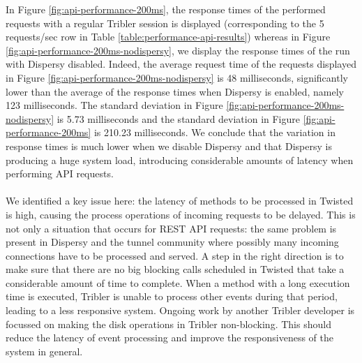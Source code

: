 In Figure \ref{fig:api-performance-200ms}, the response times of the performed requests with a regular Tribler session is displayed (corresponding to the 5 requests/sec row in Table \ref{table:performance-api-results}) whereas in Figure \ref{fig:api-performance-200ms-nodispersy}, we display the response times of the run with Dispersy disabled. Indeed, the average request time of the requests displayed in Figure \ref{fig:api-performance-200ms-nodispersy} is 48 milliseconds, significantly lower than the average of the response times when Dispersy is enabled, namely 123 milliseconds. The standard deviation in Figure \ref{fig:api-performance-200ms-nodispersy} is 5.73 milliseconds and the standard deviation in Figure \ref{fig:api-performance-200ms} is 210.23 milliseconds. We conclude that the variation in response times is much lower when we disable Dispersy and that Dispersy is producing a huge system load, introducing considerable amounts of latency when performing API requests.\\\\
We identified a key issue here: the latency of methods to be processed in Twisted is high, causing the process operations of incoming requests to be delayed. This is not only a situation that occurs for REST API requests: the same problem is present in Dispersy and the tunnel community where possibly many incoming connections have to be processed and served. A step in the right direction is to make sure that there are no big blocking calls scheduled in Twisted that take a considerable amount of time to complete. When a method with a long execution time is executed, Tribler is unable to process other events during that period, leading to a less responsive system. Ongoing work by another Tribler developer is focussed on making the disk operations in Tribler non-blocking. This should reduce the latency of event processing and improve the responsiveness of the system in general.\\\\
